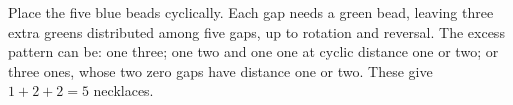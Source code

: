 Place the five blue beads cyclically. Each gap needs a green bead, leaving three extra greens distributed among five gaps, up to rotation and reversal. The excess pattern can be: one three; one two and one one at cyclic distance one or two; or three ones, whose two zero gaps have distance one or two. These give $1+2+2=\boxed5$ necklaces.

